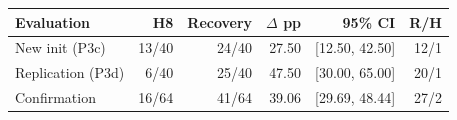\begin{tabular}{lrrrrr}
\toprule
Evaluation & H8 & Recovery & $\Delta$ pp & 95\% CI & R/H \\
\midrule
New init (P3c) & 13/40 & 24/40 & 27.50 & [12.50, 42.50] & 12/1 \\
Replication (P3d) & 6/40 & 25/40 & 47.50 & [30.00, 65.00] & 20/1 \\
Confirmation & 16/64 & 41/64 & 39.06 & [29.69, 48.44] & 27/2 \\
\bottomrule
\end{tabular}
